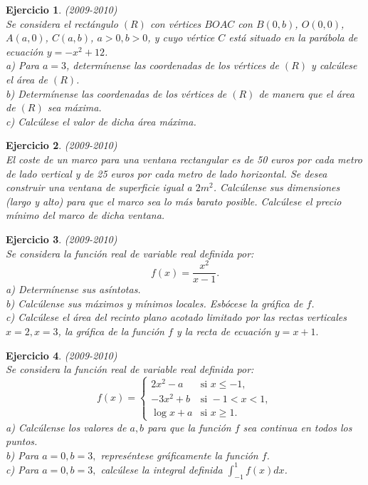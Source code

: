 \documentclass[12pt, a4paper]{amsart}
\newtheorem{ejer}{Ejercicio}
\begin{document}
\begin{ejer}\em (2009-2010)\\
Se considera el rectángulo $(R)$ con vértices $BOAC$ con $B(0,b)$, $O(0,0)$, $A(a,0)$, $C(a,b)$, $a>0,b>0$, y cuyo vértice $C$ está situado en la parábola de ecuación $y=-x^2+12$.\\
a) Para $a=3$, determínense las coordenadas de los vértices de $(R)$ y calcúlese el área de $(R)$.\\
b) Determínense las coordenadas de los vértices de $(R)$ de manera que el área de $(R)$ sea máxima.\\
c) Calcúlese el valor de dicha área máxima.
\end{ejer}

\begin{ejer}\em (2009-2010)\\
El coste de un marco para una ventana rectangular es de 50 euros por cada metro de lado vertical y de 25 euros por cada metro de lado horizontal. Se desea construir una ventana de superficie igual a $2m^2$. Calcúlense sus dimensiones (largo y alto) para que el marco sea lo más barato posible. Calcúlese el precio mínimo del marco de dicha ventana.
\end{ejer}

\begin{ejer}\em (2009-2010)\\%
Se considera la función real de variable real definida por: 
$$
f(x)=\frac{x^2}{x-1}.
$$
a) Determínense sus asíntotas.\\
b) Calcúlense sus máximos y mínimos locales. Esbócese la gráfica de $f$.\\
c) Calcúlese el área del recinto plano acotado limitado por las rectas verticales $x=2,x=3$, la gráfica de la función $f$ y la recta de ecuación $y=x+1.$
\end{ejer}

\begin{ejer}\em (2009-2010)\\%
Se considera la función real de variable real definida por:
\begin{equation*}
f(x)=\left \{ \begin{matrix} 2x^2-a & \mbox{si } x\leq -1,
\\ -3x^2+b & \mbox{si } -1<x<1,
\\ \log x+a & \mbox{si } x\geq 1. \end{matrix}\right. 
\end{equation*}
a) Calcúlense los valores de $a,b$ para que la función $f$ sea continua en todos los puntos.\\
b) Para $a=0,b=3,$ represéntese gráficamente la función $f$.\\
c) Para $a=0,b=3,$ calcúlese la integral definida $\int_{-1}^1f(x)dx$.
\end{ejer}
\end{document}
